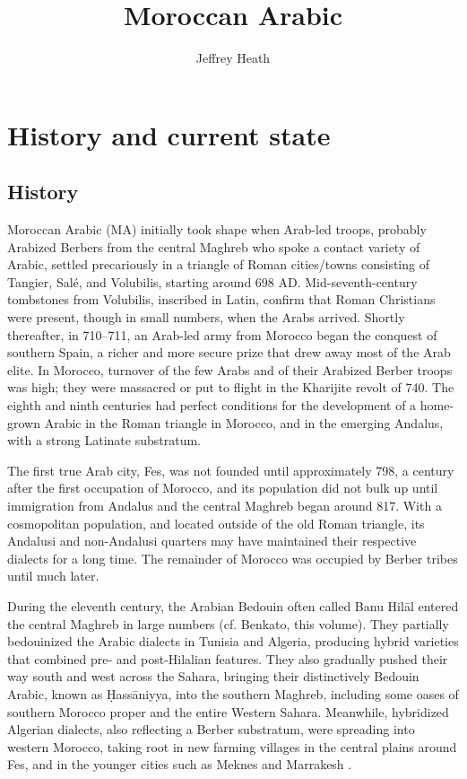 \documentclass[output=paper]{langsci/langscibook}
\title{Moroccan Arabic}
\author{Jeffrey Heath\affiliation{University of Michigan}}
\begin{document}
\section{History and current state}

\subsection{History}

Moroccan Arabic (MA) initially took shape when Arab-led troops, probably Arabized Berbers from the central Maghreb who spoke a contact variety of Arabic, settled precariously in a triangle of Roman cities/towns consisting of Tangier, Salé, and Volubilis, starting around 698 AD. Mid-seventh-century tombstones from Volubilis, inscribed in Latin, confirm that Roman Christians were present, though in small numbers, when the Arabs arrived. Shortly thereafter, in 710–711, an Arab-led army from Morocco began the conquest of southern Spain, a richer and more secure prize that drew away most of the Arab elite. In Morocco, turnover of the few Arabs and of their Arabized Berber troops was high; they were massacred or put to flight in the Kharijite revolt of 740. The eighth and ninth centuries had perfect conditions for the development of a home-grown Arabic in the Roman triangle in Morocco, and in the emerging Andalus, with a strong Latinate substratum.  

The first true Arab city, Fes, was not founded until approximately 798, a century after the first occupation of Morocco, and its population did not bulk up until immigration from Andalus and the central Maghreb began around 817. With a cosmopolitan population, and located outside of the old Roman triangle, its Andalusi and non-Andalusi quarters may have maintained their respective dialects for a long time. The remainder of Morocco was occupied by Berber tribes until much later.

During the eleventh century, the Arabian Bedouin often called Banu Hilāl entered the central Maghreb in large numbers (cf. Benkato, this volume). They partially bedouinized the Arabic dialects in Tunisia and Algeria, producing hybrid varieties that combined pre- and post-Hilalian features. They also gradually pushed their way south and west across the Sahara, bringing their distinctively Bedouin Arabic, known as Ḥassāniyya, into the southern Maghreb, including some oases of southern Morocco proper and the entire Western Sahara. Meanwhile, hybridized Algerian dialects, also reflecting a Berber substratum, were spreading into western Morocco, taking root in new farming villages in the central plains around Fes, and in the younger cities such as Meknes and Marrakesh \citep{Heath2002}.
\end{document}
